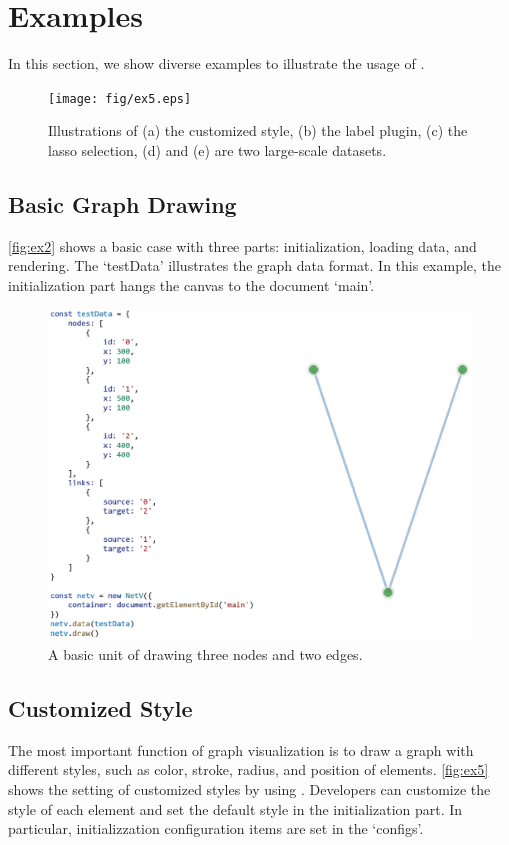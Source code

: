 \section{Examples}
In this section, we show diverse examples to illustrate the usage of \name.
\begin{figure}
    \texttt{[image: fig/ex5.eps]}
    \caption{
        Illustrations of (a) the customized style, (b) the label plugin, (c) the lasso selection, (d) and (e) are two large-scale datasets.
    }
    \label{fig:ex5}
\end{figure}

\subsection{Basic Graph Drawing}
\autoref{fig:ex2} shows a basic case with three parts: initialization, loading data, and rendering. The `testData' illustrates the graph data format. In this example, the initialization part hangs the canvas to the document `main'.
\begin{figure}
    \includegraphics[width=\linewidth]{fig/ex2.eps}
    \caption{
        A basic unit of drawing three nodes and two edges.
    }
    \label{fig:ex2}
\end{figure}

\subsection{Customized Style}
The most important function of graph visualization is to draw a graph with different styles, such as color, stroke, radius, and position of elements.
\autoref{fig:ex5} shows the setting of customized styles by using \name. Developers can customize the style of each element and set the default style in the initialization part. In particular, initializzation configuration items are set in the `configs'.


